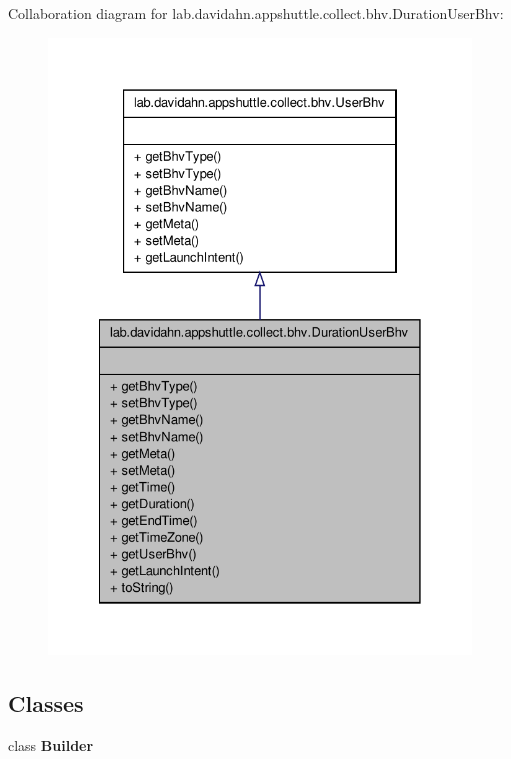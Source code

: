 \-Collaboration diagram for lab.\-davidahn.\-appshuttle.\-collect.\-bhv.\-Duration\-User\-Bhv\-:
\nopagebreak
\begin{figure}[H]
\begin{center}
\leavevmode
\includegraphics[width=328pt]{classlab_1_1davidahn_1_1appshuttle_1_1collect_1_1bhv_1_1_duration_user_bhv__coll__graph}
\end{center}
\end{figure}
\subsection*{\-Classes}
\begin{DoxyCompactItemize}
\item 
class {\bfseries \-Builder}
\end{DoxyCompactItemize}

